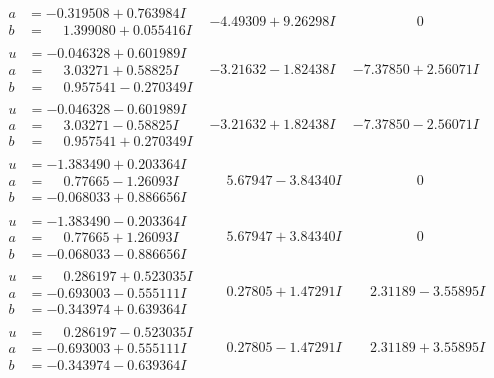 \documentclass[1p]{elsarticle_modified}
\theoremstyle{definition}
\begin{document}
$$\begin{array}{c|c|c}
\begin{aligned}
a &= -0.319508 + 0.763984 I \\
b &= \phantom{-}1.399080 + 0.055416 I\end{aligned}
 & -4.49309 + 9.26298 I & \phantom{-0.000000 } 0 \\ \hline\begin{aligned}
u &= -0.046328 + 0.601989 I \\
a &= \phantom{-}3.03271 + 0.58825 I \\
b &= \phantom{-}0.957541 - 0.270349 I\end{aligned}
 & -3.21632 - 1.82438 I & -7.37850 + 2.56071 I \\ \hline\begin{aligned}
u &= -0.046328 - 0.601989 I \\
a &= \phantom{-}3.03271 - 0.58825 I \\
b &= \phantom{-}0.957541 + 0.270349 I\end{aligned}
 & -3.21632 + 1.82438 I & -7.37850 - 2.56071 I \\ \hline\begin{aligned}
u &= -1.383490 + 0.203364 I \\
a &= \phantom{-}0.77665 - 1.26093 I \\
b &= -0.068033 + 0.886656 I\end{aligned}
 & \phantom{-}5.67947 - 3.84340 I & \phantom{-0.000000 } 0 \\ \hline\begin{aligned}
u &= -1.383490 - 0.203364 I \\
a &= \phantom{-}0.77665 + 1.26093 I \\
b &= -0.068033 - 0.886656 I\end{aligned}
 & \phantom{-}5.67947 + 3.84340 I & \phantom{-0.000000 } 0 \\ \hline\begin{aligned}
u &= \phantom{-}0.286197 + 0.523035 I \\
a &= -0.693003 - 0.555111 I \\
b &= -0.343974 + 0.639364 I\end{aligned}
 & \phantom{-}0.27805 + 1.47291 I & \phantom{-}2.31189 - 3.55895 I \\ \hline\begin{aligned}
u &= \phantom{-}0.286197 - 0.523035 I \\
a &= -0.693003 + 0.555111 I \\
b &= -0.343974 - 0.639364 I\end{aligned}
 & \phantom{-}0.27805 - 1.47291 I & \phantom{-}2.31189 + 3.55895 I \\ \hline\begin{aligned}

\end{aligned}
\end{array}$$
\end{document}
